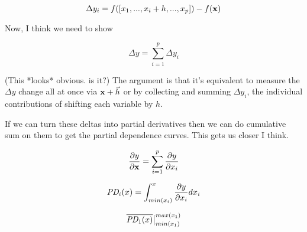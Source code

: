 \documentclass[12pt]{article}
\newcommand{\cut}[1]{}
\begin{document}
\[
\Delta y_i = f([x_1, ..., x_i+h, ..., x_p]) - f({\bf x})
\]

Now, I think we need to show

\[
\Delta y = \sum_{i=1}^{p} \Delta y_i
\]

(This *looks* obvious. is it?) The argument is that it's equivalent to measure the $\Delta y$ change all at once via ${\bf x} + \vec{h}$ or by collecting and summing $\Delta y_i$, the individual contributions of shifting each variable by $h$.  

If we can turn these deltas into partial derivatives then we can do cumulative sum on them to get the partial dependence curves. This gets us closer I think.


\[
\frac{\partial y}{\partial \bf x} = \sum_{i=1}^p \frac{\partial y}{\partial x_i}
\]

\[
\text{\it PD}_i(x) = \int_{min(x_i)}^x \frac{\partial y}{\partial x_i} dx_i
\]

\[
\overline{\text{\it PD}_1(x)}\big |_{min(x_1)}^{max(x_1)}
\]

\cut{
\noindent At $x_i$ for some $h$ (maybe $h$ is instance index).

Define the gradient:

\[
\nabla {\bf x} = [\frac{\partial y}{\partial x_1}, \ldots, \frac{\partial y}{\partial x_p}]
\]

When we move from ${\bf x}$ to ${\bf x}+\nabla {\bf x}$, we add some $\Delta y$ to $y$ so

\[
f({\bf x}+\nabla {\bf x}) = y + \Delta y 
\]

I think we need to show

\[
\Delta y_i = \frac{f(x_i + h) - f(x_i)}{h}
\]

\[
\Delta y = \sum_{i=1}^{p} \Delta y_i
\]
}




\end{document}
